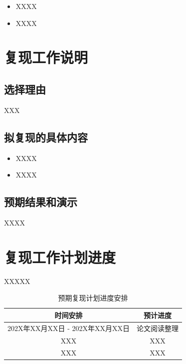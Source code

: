 \documentclass[UTF8,12pt]{article} %
\begin{document}
\begin{itemize}
    \item XXXX
    \item XXXX
\end{itemize}



\section{复现工作说明}

\subsection{选择理由}

XXX

\subsection{拟复现的具体内容}

\begin{itemize}
    \item XXXX
    \item XXXX
\end{itemize}

\subsection{预期结果和演示}

XXXX


\section{复现工作计划进度}

XXXXX


\begin{table}[H]
    \centering
    \begin{tabular}{c|c}
    \hline
    \textbf{时间安排}         & \textbf{预计进度} \\ \hline
    202X年XX月XX日 - 202X年XX月XX日 & 论文阅读整理        \\
    XXX                   & XXX           \\
    XXX                   & XXX           \\ \hline
    \end{tabular}
    \caption{预期复现计划进度安排}
    \label{tab:my_schedule}
\end{table}





\end{document}
